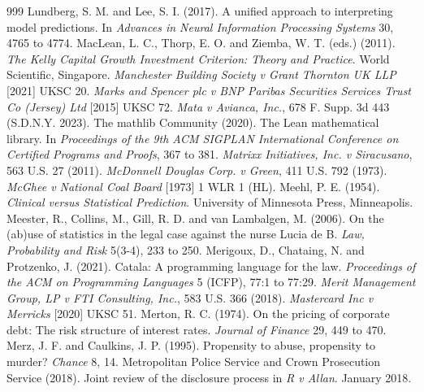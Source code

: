 \begin{thebibliography}{999}
 Lundberg, S. M. and Lee, S. I. (2017). A unified approach to interpreting model predictions. In \emph{Advances in Neural Information Processing Systems} 30, 4765 to 4774.
 MacLean, L. C., Thorp, E. O. and Ziemba, W. T. (eds.) (2011). \emph{The Kelly Capital Growth Investment Criterion: Theory and Practice}. World Scientific, Singapore.
 \emph{Manchester Building Society v Grant Thornton UK LLP} [2021] UKSC 20.
 \emph{Marks and Spencer plc v BNP Paribas Securities Services Trust Co (Jersey) Ltd} [2015] UKSC 72.
 \emph{Mata v Avianca, Inc.}, 678 F. Supp. 3d 443 (S.D.N.Y. 2023).
 The mathlib Community (2020). The Lean mathematical library. In \emph{Proceedings of the 9th ACM SIGPLAN International Conference on Certified Programs and Proofs}, 367 to 381.
 \emph{Matrixx Initiatives, Inc. v Siracusano}, 563 U.S. 27 (2011).
 \emph{McDonnell Douglas Corp. v Green}, 411 U.S. 792 (1973).
 \emph{McGhee v National Coal Board} [1973] 1 WLR 1 (HL).
 Meehl, P. E. (1954). \emph{Clinical versus Statistical Prediction}. University of Minnesota Press, Minneapolis.
 Meester, R., Collins, M., Gill, R. D. and van Lambalgen, M. (2006). On the (ab)use of statistics in the legal case against the nurse Lucia de B. \emph{Law, Probability and Risk} 5(3-4), 233 to 250.
 Merigoux, D., Chataing, N. and Protzenko, J. (2021). Catala: A programming language for the law. \emph{Proceedings of the ACM on Programming Languages} 5 (ICFP), 77:1 to 77:29.
 \emph{Merit Management Group, LP v FTI Consulting, Inc.}, 583 U.S. 366 (2018).
 \emph{Mastercard Inc v Merricks} [2020] UKSC 51.
 Merton, R. C. (1974). On the pricing of corporate debt: The risk structure of interest rates. \emph{Journal of Finance} 29, 449 to 470.
 Merz, J. F. and Caulkins, J. P. (1995). Propensity to abuse, propensity to murder? \emph{Chance} 8, 14.
 Metropolitan Police Service and Crown Prosecution Service (2018). Joint review of the disclosure process in \emph{R v Allan}. January 2018.

\end{thebibliography}
